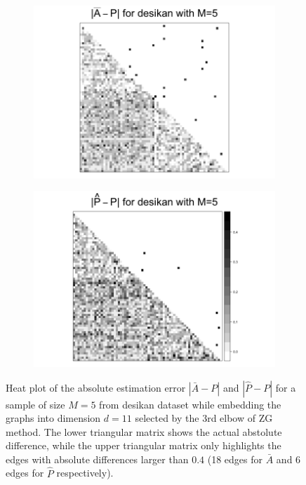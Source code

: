 \documentclass[a4paper]{article}
\begin{document}
\begin{figure}
\centering
\begin{subfigure}{.5\textwidth}
  \centering
  \includegraphics[width=1.2\linewidth]{Diff2_desikan_m5.png}
\end{subfigure}%
\begin{subfigure}{.5\textwidth}
  \centering
  \includegraphics[width=1.2\linewidth]{Diff3_desikan_m5.png}
\end{subfigure}
\caption{Heat plot of the absolute estimation error $|\bar{A} - P|$ and $|\hat{P} - P|$ for a sample of size $M=5$ from desikan dataset while embedding the graphs into dimension $d=11$ selected by the 3rd elbow of ZG method. The lower triangular matrix shows the actual abstolute difference, while the upper triangular matrix only highlights the edges with absolute differences larger than $0.4$ (18 edges for $\bar{A}$ and 6 edges for $\hat{P}$ respectively).}
\label{fig:Diff_desikan_m5}
\end{figure}
\end{document}
